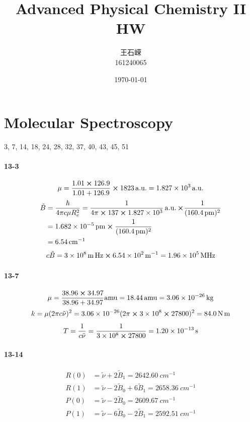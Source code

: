 \documentclass[a4paper]{article}
\title{\textbf{Advanced Physical Chemistry II}\\HW}
\author{王石嵘
\vspace{5pt}\\
161240065\\
}
\date{\today} %
\newcommand{\ex}[1]{\paragraph{13-#1}}
\DeclareMathOperator{\au}{\mathrm{a.u.}}
\numberwithin{equation}{section}
\begin{document}

\maketitle



\setcounter{section}{12}
\section{Molecular Spectroscopy}
3, 7, 14, 18, 24, 28, 32, 37, 40, 43, 45, 51\\
\ex{3}
\begin{equation}\label{key}
\mu = \dfrac{1.01 \cross 126.9}{1.01 + 126.9}\cross \num{1823}\au = \num{1.827e3}\au
\end{equation}
\begin{align}\label{key}
\tilde{B} &= \dfrac{\hbar}{4\pi c\mu R_e^2} = \dfrac{1}{4\pi\cross 137 \cross \num{1.827e3}}\au \cross\dfrac{1}{(\SI{160.4}{pm})^2}\notag\\
&= \SI{1.682e-5}{pm}\cross\dfrac{1}{(\SI{160.4}{pm})^2}\notag\\
&= \SI{6.54}{cm^{-1}}
\end{align}
\begin{align}
c\tilde{B} = \SI{3e8}{m.Hz}\cross\SI{6.54e2}{m^{-1}} = \SI{1.96e5}{MHz}
\end{align}
\ex{7}
\begin{equation}\label{key}
\mu = \dfrac{38.96\cross 34.97}{38.96 + 34.97}\si{amu} = \SI{18.44}{amu} = \SI{3.06e-26}{kg}
\end{equation}
\begin{equation}\label{key}
k = \mu(2\pi c \tilde{\nu})^2 = \num{3.06e-26} (2\pi \cross\num{3e8}\cross 27800)^2 = \SI{84.0}{N.m}
\end{equation}
\begin{equation}\label{key}
T = \dfrac{1}{c\tilde{\nu}} = \dfrac{1}{\num{3e8}\cross 27800} = \SI{1.20e-13}{s}
\end{equation}
\ex{14}
\begin{align}
R(0) &= \tilde{\nu} + 2\tilde{B}_1 = \SI{2642.60}{cm^{-1}}\\
R(1) &= \tilde{\nu} - 2\tilde{B}_0 + 6\tilde{B}_1 = \SI{2658.36}{cm^{-1}}\\
P(0) &= \tilde{\nu} - 2\tilde{B}_0 = \SI{2609.67}{cm^{-1}}\\
P(1) &= \tilde{\nu} - 6\tilde{B}_0 - 2\tilde{B}_1 = \SI{2592.51}{cm^{-1}}
\end{align}
\end{document}
